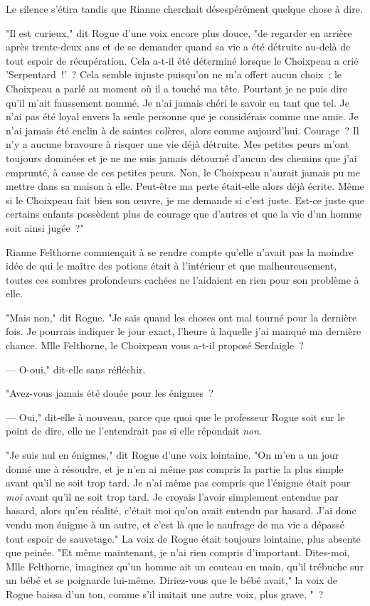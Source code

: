 Le silence s'étira tandis que Rianne cherchait désespérément quelque chose à dire.

"Il est curieux," dit Rogue d'une voix encore plus douce, "de regarder en arrière après trente-deux ans et de se demander quand sa vie a été détruite au-delà de tout espoir de récupération. Cela a-t-il été déterminé lorsque le Choixpeau a crié 'Serpentard~!'~? Cela semble injuste puisqu'on ne m'a offert aucun choix~; le Choixpeau a parlé au moment où il a touché ma tête. Pourtant je ne puis dire qu'il m'ait faussement nommé. Je n'ai jamais chéri le savoir en tant que tel. Je n'ai pas été loyal envers la seule personne que je considérais comme une amie. Je n'ai jamais été enclin à de saintes colères, alors comme aujourd'hui. Courage~? Il n'y a aucune bravoure à risquer une vie déjà détruite. Mes petites peurs m'ont toujours dominées et je ne me suis jamais détourné d'aucun des chemins que j'ai emprunté, à cause de ces petites peurs. Non, le Choixpeau n'aurait jamais pu me mettre dans sa maison à elle. Peut-être ma perte était-elle alors déjà écrite. Même si le Choixpeau fait bien son œuvre, je me demande si c'est juste. Est-ce juste que certains enfants possèdent plus de courage que d'autres et que la vie d'un homme soit ainsi jugée~?"

Rianne Felthorne commençait à se rendre compte qu'elle n'avait pas la moindre idée de qui le maître des potions était à l'intérieur et que malheureusement, toutes ces sombres profondeurs cachées ne l'aidaient en rien pour son problème à elle.

"Mais non," dit Rogue. "Je sais quand les choses ont mal tourné pour la dernière fois. Je pourrais indiquer le jour exact, l'heure à laquelle j'ai manqué ma dernière chance. Mlle Felthorne, le Choixpeau vous a-t-il proposé Serdaigle~?

--- O-oui," dit-elle sans réfléchir.

"Avez-vous jamais été douée pour les énigmes~?

--- Oui," dit-elle à nouveau, parce que quoi que le professeur Rogue soit sur le point de dire, elle ne l'entendrait pas si elle répondait \emph{non}.

"Je suis nul en énigmes," dit Rogue d'une voix lointaine. "On m'en a un jour donné une à résoudre, et je n'en ai même pas compris la partie la plus simple avant qu'il ne soit trop tard. Je n'ai même pas compris que l'énigme était pour \emph{moi} avant qu'il ne soit trop tard. Je croyais l'avoir simplement entendue par hasard, alors qu'en réalité, c'était moi qu'on avait entendu par hasard. J'ai donc vendu mon énigme à un autre, et c'est là que le naufrage de ma vie a dépassé tout espoir de sauvetage." La voix de Rogue était toujours lointaine, plus absente que peinée. "Et même maintenant, je n'ai rien compris d'important. Dites-moi, Mlle Felthorne, imaginez qu'un homme ait un couteau en main, qu'il trébuche sur un bébé et se poignarde lui-même. Diriez-vous que le bébé avait," la voix de Rogue baissa d'un ton, comme s'il imitait une autre voix, plus grave, "~?

